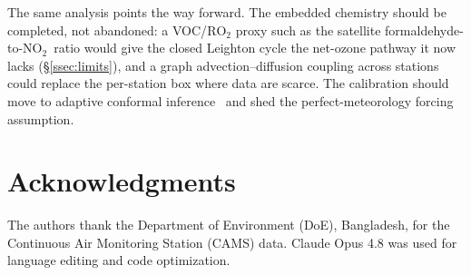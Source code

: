 \documentclass[conference]{IEEEtran}
\newcommand{\notwo}{\ensuremath{\mathrm{NO_2}}}
\begin{document}
The same analysis points the way forward. The embedded chemistry should be completed, not abandoned: a
VOC/$\mathrm{RO_2}$ proxy such as the satellite formaldehyde-to-\notwo\ ratio would give the closed
Leighton cycle the net-ozone pathway it now lacks (\S\ref{ssec:limits}), and a graph advection--diffusion
coupling across stations~\cite{hettige2024} could replace the per-station box where data are scarce. The
calibration should move to adaptive conformal inference~\cite{gibbs2021} and shed the perfect-meteorology
forcing assumption.

\section*{Acknowledgments}
The authors thank the Department of Environment (DoE), Bangladesh, for the Continuous Air Monitoring Station (CAMS) data. Claude Opus 4.8 was used for language editing and code optimization.
\end{document}
